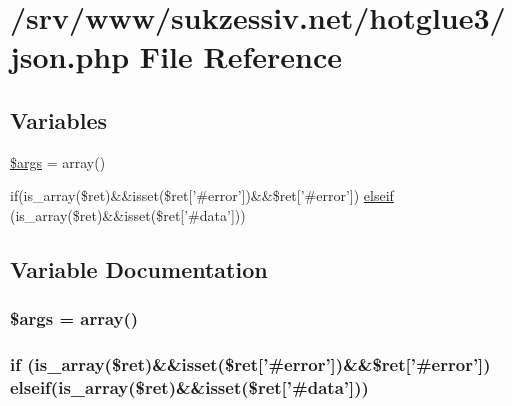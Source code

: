 \hypertarget{json_8php}{
\section{/srv/www/sukzessiv.net/hotglue3/json.php File Reference}
\label{json_8php}
}
\subsection*{Variables}
\begin{CompactItemize}
\item 
\hyperlink{json_8php_67e94494731d99ed23b123e95175bc10}{\$args} = array()
\item 
if(is\_\-array(\$ret)\&\&isset(\$ret\mbox{[}'\#error'\mbox{]})\&\&\$ret\mbox{[}'\#error'\mbox{]}) \hyperlink{json_8php_ffd32ec1771cd364116738727d3a1ed8}{elseif} (is\_\-array(\$ret)\&\&isset(\$ret\mbox{[}'\#data'\mbox{]}))
\end{CompactItemize}


\subsection{Variable Documentation}
\hypertarget{json_8php_67e94494731d99ed23b123e95175bc10}{
\subsubsection[{\$args}]{\setlength{\rightskip}{0pt plus 5cm}\$args = array()}}
\label{json_8php_67e94494731d99ed23b123e95175bc10}


\hypertarget{json_8php_ffd32ec1771cd364116738727d3a1ed8}{
\subsubsection[{elseif}]{\setlength{\rightskip}{0pt plus 5cm}if (is\_\-array(\$ret)\&\&isset(\$ret\mbox{[}'\#error'\mbox{]})\&\&\$ret\mbox{[}'\#error'\mbox{]}) {\bf elseif}(is\_\-array(\$ret)\&\&isset(\$ret\mbox{[}'\#data'\mbox{]}))}}
\label{json_8php_ffd32ec1771cd364116738727d3a1ed8}


